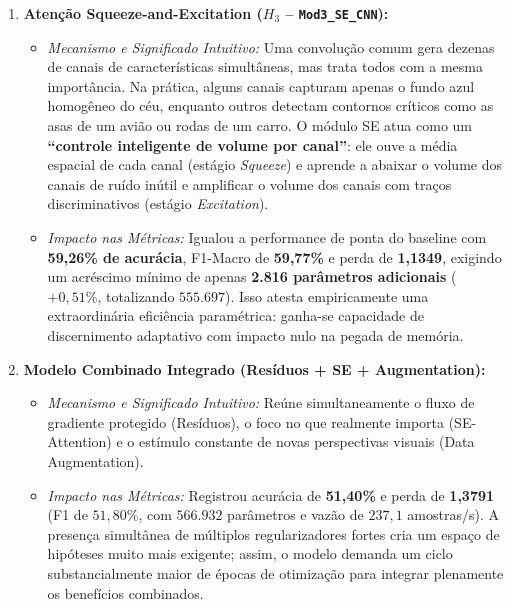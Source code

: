 \documentclass[runningheads]{llncs}
\begin{document}
\begin{enumerate}
    \item \textbf{Aten\c{c}\~{a}o Squeeze-and-Excitation ($H_3$ -- \texttt{Mod3\_SE\_CNN}):}
    \begin{itemize}
        \item \textit{Mecanismo e Significado Intuitivo:} Uma convolu\c{c}\~{a}o comum gera dezenas de canais de caracter\'{i}sticas simult\^{a}neas, mas trata todos com a mesma import\^{a}ncia. Na pr\'{a}tica, alguns canais capturam apenas o fundo azul homog\^{e}neo do c\'{e}u, enquanto outros detectam contornos cr\'{i}ticos como as asas de um avi\~{a}o ou rodas de um carro. O m\'{o}dulo SE atua como um \textbf{``controle inteligente de volume por canal''}: ele ouve a m\'{e}dia espacial de cada canal (est\'{a}gio \textit{Squeeze}) e aprende a abaixar o volume dos canais de ru\'{i}do in\'{u}til e amplificar o volume dos canais com tra\c{c}os discriminativos (est\'{a}gio \textit{Excitation}).
        \item \textit{Impacto nas M\'{e}tricas:} Igualou a performance de ponta do baseline com \textbf{59,26\% de acur\'{a}cia}, F1-Macro de \textbf{59,77\%} e perda de \textbf{1,1349}, exigindo um acr\'{e}scimo m\'{i}nimo de apenas \textbf{2.816 par\^{a}metros adicionais} ($+0{,}51\%$, totalizando $555.697$). Isso atesta empiricamente uma extraordin\'{a}ria efici\^{e}ncia param\'{e}trica: ganha-se capacidade de discernimento adaptativo com impacto nulo na pegada de mem\'{o}ria.
    \end{itemize}

    \item \textbf{Modelo Combinado Integrado (Res\'{i}duos + SE + Augmentation):}
    \begin{itemize}
        \item \textit{Mecanismo e Significado Intuitivo:} Re\'{u}ne simultaneamente o fluxo de gradiente protegido (Res\'{i}duos), o foco no que realmente importa (SE-Attention) e o est\'{i}mulo constante de novas perspectivas visuais (Data Augmentation).
        \item \textit{Impacto nas M\'{e}tricas:} Registrou acur\'{a}cia de \textbf{51,40\%} e perda de \textbf{1,3791} (F1 de $51{,}80\%$, com $566.932$ par\^{a}metros e vaz\~{a}o de $237{,}1$ amostras/s). A presen\c{c}a simult\^{a}nea de m\'{u}ltiplos regularizadores fortes cria um espa\c{c}o de hip\'{o}teses muito mais exigente; assim, o modelo demanda um ciclo substancialmente maior de \'{e}pocas de otimiza\c{c}\~{a}o para integrar plenamente os benef\'{i}cios combinados.
    \end{itemize}
\end{enumerate}
\end{document}
